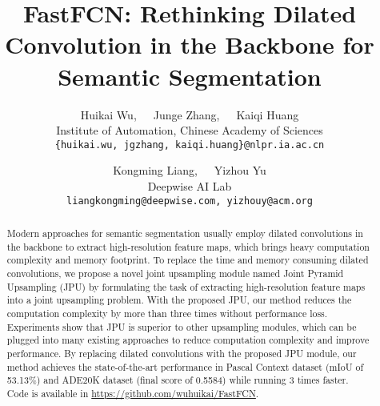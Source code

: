 \documentclass[10pt,twocolumn,letterpaper]{article}
\begin{document}
\title{FastFCN: Rethinking Dilated Convolution in the Backbone for Semantic Segmentation}

\author{Huikai Wu,~~~Junge Zhang,~~~Kaiqi Huang\\
Institute of Automation, Chinese Academy of Sciences\\
{\tt\small\{huikai.wu, jgzhang, kaiqi.huang\}@nlpr.ia.ac.cn}
\and
Kongming Liang,~~~Yizhou Yu\\
Deepwise AI Lab\\
{\tt\small liangkongming@deepwise.com, yizhouy@acm.org}
}

\maketitle



\begin{abstract}
Modern approaches for semantic segmentation usually employ dilated convolutions in the backbone to extract high-resolution feature maps, which brings heavy computation complexity and memory footprint.
To replace the time and memory consuming dilated convolutions, we propose a novel joint upsampling module named Joint Pyramid Upsampling (JPU) by formulating the task of extracting high-resolution feature maps into a joint upsampling problem.
With the proposed JPU, our method reduces the computation complexity by more than three times without performance loss.
Experiments show that JPU is superior to other upsampling modules, which can be plugged into many existing approaches to reduce computation complexity and improve performance.
By replacing dilated convolutions with the proposed JPU module, our method achieves the state-of-the-art performance in Pascal Context dataset (mIoU of 53.13\%) and ADE20K dataset (final score of 0.5584) while running 3 times faster.
Code is available in \url{https://github.com/wuhuikai/FastFCN}.
\end{abstract}
\end{document}
